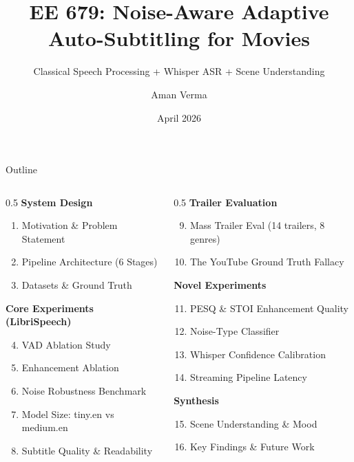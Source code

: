 \documentclass[aspectratio=169]{beamer}
\title[EE 679: Movie Auto-Subtitling]{EE 679: Noise-Aware Adaptive Auto-Subtitling for Movies}
\subtitle{Classical Speech Processing + Whisper ASR + Scene Understanding}
\author{Aman Verma}
\institute{Department of Electrical Engineering\\Indian Institute of Technology Bombay}
\date{April 2026}
\begin{document}
\begin{frame}
  \titlepage
\end{frame}

\begin{frame}{Outline}
  \begin{columns}[T]
    \begin{column}{0.5\textwidth}
      \textbf{System Design}
      \begin{enumerate}
        \item Motivation \& Problem Statement
        \item Pipeline Architecture (6 Stages)
        \item Datasets \& Ground Truth
      \end{enumerate}
      \vspace{0.3cm}
      \textbf{Core Experiments (LibriSpeech)}
      \begin{enumerate}
        \setcounter{enumi}{3}
        \item VAD Ablation Study
        \item Enhancement Ablation
        \item Noise Robustness Benchmark
        \item Model Size: tiny.en vs medium.en
        \item Subtitle Quality \& Readability
      \end{enumerate}
    \end{column}
    \begin{column}{0.5\textwidth}
      \textbf{Trailer Evaluation}
      \begin{enumerate}
        \setcounter{enumi}{8}
        \item Mass Trailer Eval (14 trailers, 8 genres)
        \item The YouTube Ground Truth Fallacy
      \end{enumerate}
      \vspace{0.3cm}
      \textbf{Novel Experiments}
      \begin{enumerate}
        \setcounter{enumi}{10}
        \item PESQ \& STOI Enhancement Quality
        \item Noise-Type Classifier
        \item Whisper Confidence Calibration
        \item Streaming Pipeline Latency
      \end{enumerate}
      \vspace{0.3cm}
      \textbf{Synthesis}
      \begin{enumerate}
        \setcounter{enumi}{14}
        \item Scene Understanding \& Mood
        \item Key Findings \& Future Work
      \end{enumerate}
    \end{column}
  \end{columns}
\end{frame}
\end{document}
